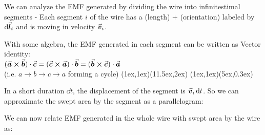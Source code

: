 \documentclass[class=article, crop=false, 12pt]{standalone}
\begin{document}

We can analyze the EMF generated by dividing the wire into infinitestimal segments - 
Each segment $i$ of the wire has a (length) + (orientation) labeled by $\dd{\va*{l}_i}$ and 
is moving in velocity $\va*{v}_i$.


With some algebra, the EMF generated in each segment can be written as 
{\scriptsize Vector identity: \\[-1ex]
    \scriptsize $(\va*{a}\cross\va*{b})\cdot\va*{c} = (\va*{c}\cross\va*{a})\cdot\va*{b} = (\va*{b}\cross\va*{c})\cdot\va*{a}$\\[-1ex]
    \scriptsize (i.e. $a\rightarrow b \rightarrow c\rightarrow a$ forming a cycle)}
{(1ex,1ex)}{(11.5ex,2ex)}
{(1ex,1ex)}{(5ex,0.3ex)}


In a short duration $\dd{t}$,
the displacement of the segment is $\va*{v}_i\dd{t}$.
So we can approximate the swept area by the segment as a parallelogram:


We can now relate EMF generated in the whole wire with swept area by the wire as:
\end{document}
